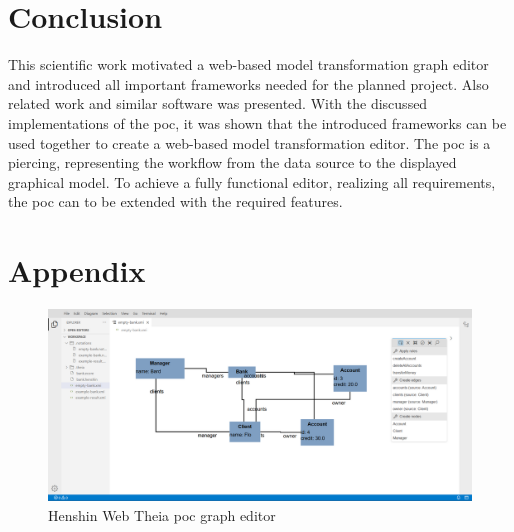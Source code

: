 \documentclass[conference,onecolumn]{IEEEtran}
\begin{document}
  \section{Conclusion}
  \label{sec:conclusion}
  This scientific work motivated a web-based model transformation graph editor and introduced all important frameworks needed for the planned project. Also related work and similar software was presented. With the discussed implementations of the \ac{poc}, it was shown that the introduced frameworks can be used together to create a web-based model transformation editor. The \ac{poc} is a piercing, representing the workflow from the data source to the displayed graphical model. To achieve a fully functional editor, realizing all requirements, the \ac{poc} can to be extended with the required features.

  

  \section{Appendix}
  \label{sec:appendix}

  \begin{figure}[H]
    \centering
    \includegraphics[width=1\textwidth]{poc}
    \caption{Henshin Web Theia \ac{poc} graph editor}
    \label{fig:poc}
  \end{figure}

  
  \printbibliography
\end{document}
